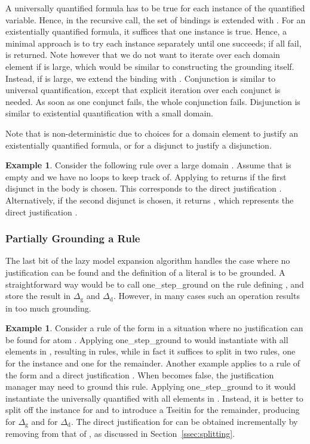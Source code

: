 \documentclass[11pt]{article}
\newcommand{\m}[1]{\ensuremath{#1}\xspace}
\newcommand{\D}{\m{\Delta}}
\theoremstyle{plain}
\theoremstyle{definition}
\theoremstyle{example_basic}
\newtheorem{example}[thm]{Example}
\theoremstyle{example_contd}
\theoremstyle{plain}
\newcommand{\groundone}{\textsf{one\_step\_ground}\xspace}
\newcommand{\Dg}{\ensuremath{\D_\text{g}}\xspace}
\newcommand{\Dd}{\ensuremath{\D_\text{d}}\xspace}
\newcommand{\change}[1]{#1}
\begin{document}
A universally quantified formula  has to be
true for each instance of the quantified variable. Hence, in the
recursive call, the set of bindings  is extended with . For an existentially quantified formula, it suffices that one
instance is true. Hence, a minimal approach is to try each instance
separately until one succeeds; if all fail, \algfalse is
returned. Note however that we do not want to iterate over each domain
element if  is large, which would be similar to constructing the
grounding itself. Instead, if  is large, we extend the binding with
. Conjunction is similar to universal quantification, except
that explicit iteration over each conjunct is needed. As soon as one
conjunct fails, the whole conjunction fails. Disjunction is similar to
existential quantification \change{with a small domain}.

\change{Note that \buildconstr is non-deterministic due to choices for a domain element to justify an existentially quantified formula, or for a disjunct to justify a disjunction.} 

\begin{example}\label{ex:build}
Consider the following rule over a large domain .  Assume that \jgraph is empty and we have no loops to keep track of. \change{Applying \buildconstr to  returns  if the first disjunct  in the body is chosen. This corresponds to the direct justification . Alternatively, if the second disjunct is chosen, it returns , which represents the direct justification .  }
\end{example}


\subsubsection{Partially Grounding a Rule}\label{sec:splitandground}
The last bit of the lazy model expansion algorithm handles the case where no justification can be found and the definition of  a literal  is to be grounded.   A straightforward way  would be to call \groundone on the  rule defining , and store  the result in \Dg and \Dd. 
However, in many cases such an operation results in too much grounding. 
\begin{example}\label{ex:splitting}
Consider a rule  of the form  in a situation where no justification can be found for atom . Applying \groundone to  would instantiate  with all elements in , resulting in  rules, while in fact it  suffices to split  in two rules, one for the instance  and one for the remainder. \change{Another example applies to a rule  of the form  and a direct justification . When  becomes false, the justification manager may need to ground this rule. Applying \groundone to it would instantiate the universally quantified  with all elements in . Instead, it is better  to  split off the instance for  and to  introduce a Tseitin  for the remainder, producing  for \Dg and  for \Dd. The direct justification for  can be obtained  incrementally by removing  from that of , as discussed in Section~\ref{ssec:splitting}.}
\end{example}
\end{document}

